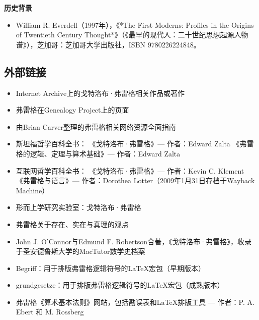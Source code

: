 \textbf{历史背景}  
\begin{itemize}
\item William R. Everdell（1997年），《*The First Moderns: Profiles in the Origins of Twentieth Century Thought*》（《最早的现代人：二十世纪思想起源人物谱》），芝加哥：芝加哥大学出版社，ISBN 9780226224848。
\end{itemize}
\subsection{外部链接}
\begin{itemize}
\item Internet Archive上的戈特洛布·弗雷格相关作品或著作  
\item 弗雷格在Genealogy Project上的页面  
\item 由Brian Carver整理的弗雷格相关网络资源全面指南  
\item 斯坦福哲学百科全书：  
    《戈特洛布·弗雷格》— 作者：Edward Zalta  
    《弗雷格的逻辑、定理与算术基础》— 作者：Edward Zalta  
\item 互联网哲学百科全书：  
   《戈特洛布·弗雷格》— 作者：Kevin C. Klement  
   《弗雷格与语言》— 作者：Dorothea Lotter（2009年1月31日存档于Wayback Machine）  
\item 形而上学研究实验室：戈特洛布·弗雷格  
\item 弗雷格关于存在、实在与真理的观点  
\item John J. O'Connor与Edmund F. Robertson合著，《戈特洛布·弗雷格》，收录于圣安德鲁斯大学的MacTutor数学史档案  
\item Begriff：用于排版弗雷格逻辑符号的LaTeX宏包（早期版本）  
\item grundgesetze：用于排版弗雷格逻辑符号的LaTeX宏包（成熟版本）  
\item 弗雷格《算术基本法则》网站，包括勘误表和LaTeX排版工具 — 作者：P. A. Ebert 和 M. Rossberg  
\end{itemize}
